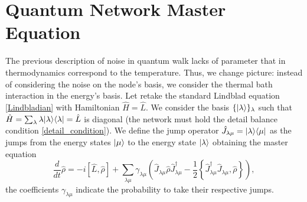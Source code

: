 \section{Quantum Network Master Equation}

The previous description of noise in quantum walk lacks of parameter that in thermodynamics correspond to the temperature. 
Thus, we change picture: instead of considering the noise on the node's basis, we consider the thermal bath interaction in the energy's basis.
Let retake the standard Lindblad equation \eqref{Lindbladian} with Hamiltonian $\hat H = \hat L$.
We consider the basis $\{\lvert\lambda\rangle\}_{\lambda}$ such that $\hat H = \sum_\lambda \lambda\lvert\lambda\rangle\langle\lambda\rvert = \hat L$ is diagonal (the network must hold the detail balance condition \eqref{detail_condition}).
We define the jump operator $\hat J_{\lambda\mu} = \lvert\lambda\rangle\langle\mu\rvert$ as the jumps from the energy states $\lvert\mu\rangle$ to the energy state $\lvert\lambda\rangle$ obtaining the master equation
\begin{equation}\label{Lindblad_energy_jump}
    \frac{d}{dt}\hat\rho = -i\left[\hat L,\hat\rho\right] + \sum_{\lambda\mu} \gamma_{\lambda\mu} \left(\hat J_{\lambda\mu} \hat\rho \hat J^\dagger_{\lambda\mu} - \frac{1}{2}\left\{ \hat J^\dagger_{\lambda\mu}\hat J_{\lambda\mu}, \hat\rho\right\} \right),
\end{equation}
the coefficients $\gamma_{\lambda\mu}$ indicate the probability to take their respective jumps.

